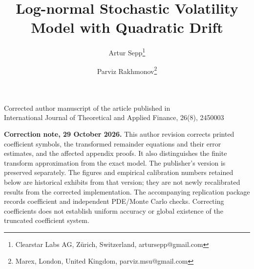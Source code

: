 \documentclass[11pt,a4paper] {article}
\date{\displaydate{date}}
\begin{document}
\title{Log-normal Stochastic Volatility Model with Quadratic Drift}

\author{Artur Sepp\thanks{Clearstar Labs AG, Z\"{u}rich, Switzerland, artursepp@gmail.com} \and Parviz Rakhmonov\thanks{Marex, London, United Kingdom, parviz.msu@gmail.com}}


\maketitle

\begin{center}
Corrected author manuscript of the article published in\\
International Journal of Theoretical and Applied Finance, 26(8), 2450003
\end{center}


\noindent\textbf{Correction note, 29 October 2026.}
This author revision corrects printed coefficient symbols, the transformed
remainder equations and their error estimates, and the affected appendix proofs.
It also distinguishes the finite transform approximation from the exact model.
The publisher's version is preserved separately. The figures and empirical
calibration numbers retained below are historical exhibits from that version;
they are not newly recalibrated results from the corrected implementation.
The accompanying replication package records coefficient and independent
PDE/Monte Carlo checks. Correcting coefficients does not establish uniform
accuracy or global existence of the truncated coefficient system.
\medskip
\end{document}

